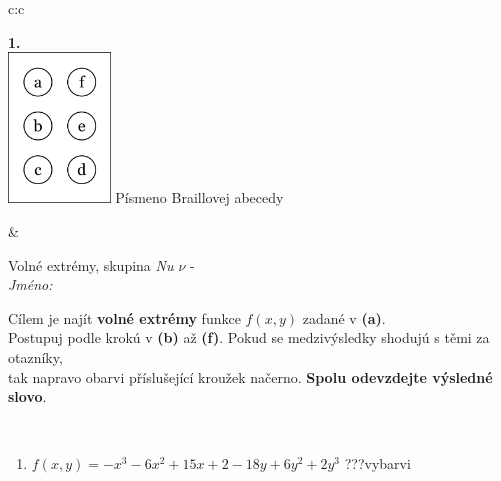 \documentclass[10pt]{report}
\begin{document}
\begin{tabular}{c:c}
\begin{minipage}[c][104.5mm][t]{0.5\linewidth}
\begin{center}
\begin{minipage}{0.79\linewidth}
\begin{center}
\begin{varwidth}{\linewidth}
\begin{enumerate}
\end{enumerate}
\end{varwidth}
\end{center}
\end{minipage}
\begin{minipage}{0.20\linewidth}
\begin{center}
{\Huge\bfseries 1.} \\[2mm]
\includegraphics[height=40mm]{../images/braille.png}
{\small Písmeno Braillovej abecedy}
\end{center}
\end{minipage}
\end{center}
\end{minipage}
&
\begin{minipage}[c][104.5mm][t]{0.5\linewidth}
\begin{center}
\vspace{7mm}
{\huge Volné extrémy, skupina \textit{Nu $\nu$} -}\\[5mm]
\textit{Jméno:}\phantom{xxxxxxxxxxxxxxxxxxxxxxxxxxxxxxxxxxxxxxxxxxxxxxxxxxxxxxxxxxxxxxxxx}\\[5mm]
\begin{minipage}{0.95\linewidth}
\begin{center}
Cílem je najít \textbf{volné extrémy} funkce $f(x,y)$ zadané v \textbf{(a)}.\\Postupuj podle krokú v \textbf{(b)} až \textbf{(f)}. Pokud se medzivýsledky shodujú s těmi za otazníky,\\tak napravo obarvi příslušející kroužek načerno. \textbf{Spolu odevzdejte výsledné slovo}.
\end{center}
\end{minipage}
\\[1mm]
\begin{minipage}{0.79\linewidth}
\begin{center}
\begin{varwidth}{\linewidth}
\begin{enumerate}
\normalsize
\item $f(x,y)=-x^3-6x^2+15x+2-18y+6y^2+2y^3$\quad \dotfill\; ???\;\dotfill \quad vybarvi

\end{enumerate}
\end{varwidth}
\end{center}
\end{minipage}
\end{center}
\end{minipage}
\end{tabular}
\end{document}
